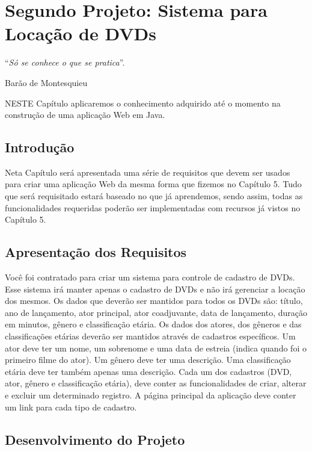 \chapter{Segundo Projeto: Sistema para Locação de DVDs}\label{cap:segundoProjeto}
\epigraph{``\textit{Só se conhece o que se pratica}''.}{Barão de Montesquieu}

\lettrine[lines=4, lhang=0.1, lraise=0, loversize=0.2, findent=0.1em]{\textcolor{corAzulTema}{N}}{ESTE} Capítulo aplicaremos o conhecimento adquirido até o momento na construção de uma aplicação Web em Java.


\section{Introdução}

Neta Capítulo será apresentada uma série de requisitos que devem ser usados para criar uma aplicação Web da mesma forma que fizemos no Capítulo 5. Tudo que será requisitado estará baseado no que já aprendemos, sendo assim, todas as funcionalidades requeridas poderão ser implementadas com recursos já vistos no Capítulo 5.


\section{Apresentação dos Requisitos}

Você foi contratado para criar um sistema para controle de cadastro de DVDs. Esse sistema irá manter apenas o cadastro de DVDs e não irá gerenciar a locação dos mesmos. Os dados que deverão ser mantidos para todos os DVDs são: título, ano de lançamento, ator principal, ator coadjuvante, data de lançamento, duração em minutos, gênero e classificação etária. Os dados dos atores, dos gêneros e das classificações etárias deverão ser mantidos através de cadastros específicos. Um ator deve ter um nome, um sobrenome e uma data de estreia (indica quando foi o primeiro filme do ator). Um gênero deve ter uma descrição. Uma classificação etária deve ter também apenas uma descrição. Cada um dos cadastros (DVD, ator, gênero e classificação etária), deve conter as funcionalidades de criar, alterar e excluir um determinado registro. A página principal da aplicação deve conter um link para cada tipo de cadastro.


\section{Desenvolvimento do Projeto}

